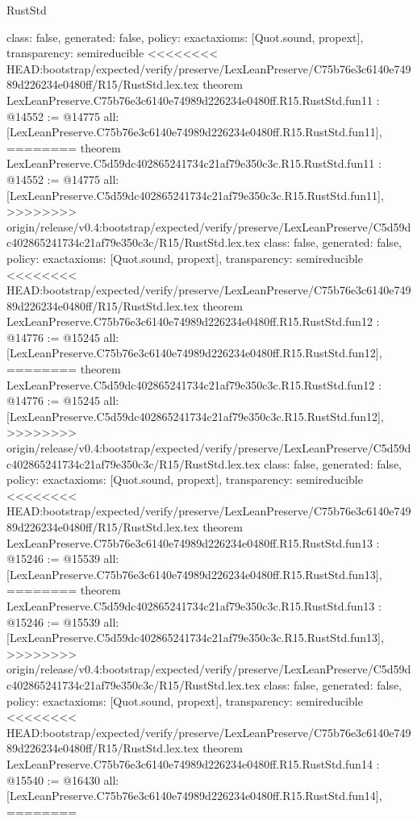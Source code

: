 \begin{lexlean}{RustStd}
\begin{coremodule}
{\begin{coremodule}
{{{{{{{{{{{{{{  class: false,
  generated: false,
  policy: exact{axioms: [Quot.sound, propext]},
  transparency: semireducible
}
<<<<<<<< HEAD:bootstrap/expected/verify/preserve/LexLeanPreserve/C75b76e3c6140e74989d226234e0480ff/R15/RustStd.lex.tex
theorem LexLeanPreserve.C75b76e3c6140e74989d226234e0480ff.R15.RustStd.fun11 : @14552 := @14775 {
  all: [LexLeanPreserve.C75b76e3c6140e74989d226234e0480ff.R15.RustStd.fun11],
========
theorem LexLeanPreserve.C5d59dc402865241734c21af79e350c3c.R15.RustStd.fun11 : @14552 := @14775 {
  all: [LexLeanPreserve.C5d59dc402865241734c21af79e350c3c.R15.RustStd.fun11],
>>>>>>>> origin/release/v0.4:bootstrap/expected/verify/preserve/LexLeanPreserve/C5d59dc402865241734c21af79e350c3c/R15/RustStd.lex.tex
  class: false,
  generated: false,
  policy: exact{axioms: [Quot.sound, propext]},
  transparency: semireducible
}
<<<<<<<< HEAD:bootstrap/expected/verify/preserve/LexLeanPreserve/C75b76e3c6140e74989d226234e0480ff/R15/RustStd.lex.tex
theorem LexLeanPreserve.C75b76e3c6140e74989d226234e0480ff.R15.RustStd.fun12 : @14776 := @15245 {
  all: [LexLeanPreserve.C75b76e3c6140e74989d226234e0480ff.R15.RustStd.fun12],
========
theorem LexLeanPreserve.C5d59dc402865241734c21af79e350c3c.R15.RustStd.fun12 : @14776 := @15245 {
  all: [LexLeanPreserve.C5d59dc402865241734c21af79e350c3c.R15.RustStd.fun12],
>>>>>>>> origin/release/v0.4:bootstrap/expected/verify/preserve/LexLeanPreserve/C5d59dc402865241734c21af79e350c3c/R15/RustStd.lex.tex
  class: false,
  generated: false,
  policy: exact{axioms: [Quot.sound, propext]},
  transparency: semireducible
}
<<<<<<<< HEAD:bootstrap/expected/verify/preserve/LexLeanPreserve/C75b76e3c6140e74989d226234e0480ff/R15/RustStd.lex.tex
theorem LexLeanPreserve.C75b76e3c6140e74989d226234e0480ff.R15.RustStd.fun13 : @15246 := @15539 {
  all: [LexLeanPreserve.C75b76e3c6140e74989d226234e0480ff.R15.RustStd.fun13],
========
theorem LexLeanPreserve.C5d59dc402865241734c21af79e350c3c.R15.RustStd.fun13 : @15246 := @15539 {
  all: [LexLeanPreserve.C5d59dc402865241734c21af79e350c3c.R15.RustStd.fun13],
>>>>>>>> origin/release/v0.4:bootstrap/expected/verify/preserve/LexLeanPreserve/C5d59dc402865241734c21af79e350c3c/R15/RustStd.lex.tex
  class: false,
  generated: false,
  policy: exact{axioms: [Quot.sound, propext]},
  transparency: semireducible
}
<<<<<<<< HEAD:bootstrap/expected/verify/preserve/LexLeanPreserve/C75b76e3c6140e74989d226234e0480ff/R15/RustStd.lex.tex
theorem LexLeanPreserve.C75b76e3c6140e74989d226234e0480ff.R15.RustStd.fun14 : @15540 := @16430 {
  all: [LexLeanPreserve.C75b76e3c6140e74989d226234e0480ff.R15.RustStd.fun14],
========
}}}}}}}}}}}}}}}}}
\end{coremodule}}
\end{coremodule}
\end{lexlean}
